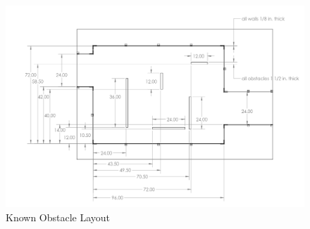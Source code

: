 \begin{figure}[H]
	\centering
	\includegraphics[width=.95\textwidth]{images/avoidance_overview.png}
	\caption{Known Obstacle Layout}
	\label{fig:avoidance_overview} 
\end{figure}
